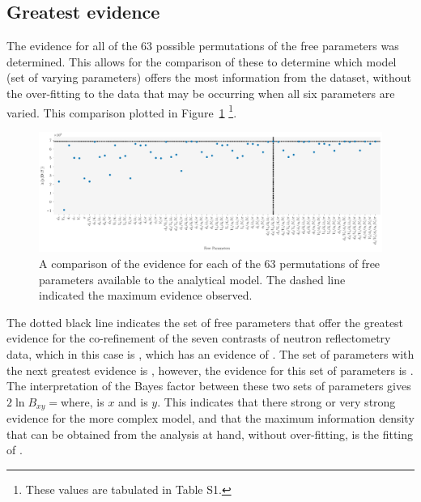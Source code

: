 \documentclass[
 reprint,
 superscriptaddress,
 amsmath,amssymb,
 aps,
]{revtex4-1}
\begin{document}
\subsection{Greatest evidence}
The evidence for all of the \num{63} possible permutations of the free parameters was determined.
This allows for the comparison of these to determine which model (set of varying parameters) offers the most information from the dataset, without the over-fitting to the data that may be occurring when all six parameters are varied. 
This comparison plotted in Figure~\ref{fig:evidence} \footnote{These values are tabulated in Table S1.}. 
%
\begin{figure}
\includegraphics[width=\textwidth]{evidence}
\caption{\label{fig:evidence} A comparison of the evidence for each of the \num{63} permutations of free parameters available to the analytical model. The dashed line indicated the maximum evidence observed.}
\end{figure}
%
The dotted black line indicates the set of free parameters that offer the greatest evidence for the co-refinement of the seven contrasts of neutron reflectometry data, which in this case is \unskip, which has an evidence of \unskip. 
The set of parameters with the next greatest evidence is \unskip, however, the evidence for this set of parameters is \unskip.
The interpretation of the Bayes factor between these two sets of parameters gives $2\ln{B_{xy}}=$\unskip\;where, \unskip\;is $x$ and \unskip\;is $y$. 
This indicates that there strong or very strong evidence for the more complex model, and that the maximum information density that can be obtained from the analysis at hand, without over-fitting, is the fitting of \unskip. 
\end{document}
